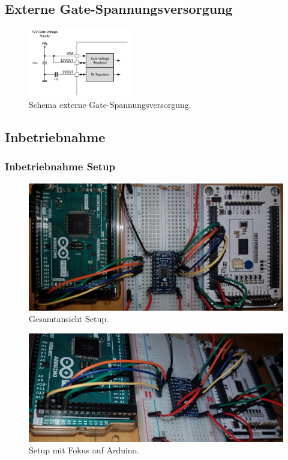 \subsection{Externe Gate-Spannungsversorgung}

\begin{figure}[H]
	\centering
	\includegraphics[width=0.4\textwidth]{graphics/Schema_Gate_Treiber_Gatespannung}
	\caption{Schema externe Gate-Spannungsversorgung.}
	\label{fig:Schema_Gate_Treiber_Gatespannung}
\end{figure}

\subsection{Inbetriebnahme}

\subsubsection{Inbetriebnahme Setup}\label{Appendix:TMC6200_Setup}

\begin{figure}[H]
	\centering
	\includegraphics[angle=270,width=\textwidth]{graphics/1_komplett}
	\caption{Gesamtansicht Setup.}
	\label{fig:1_komplett}
\end{figure}

\begin{figure}[H]
	\centering
	\includegraphics[width=\textwidth]{graphics/1_Arduino}
	\caption{Setup mit Fokus auf Arduino.}
	\label{fig:1_Arduino}
\end{figure}

